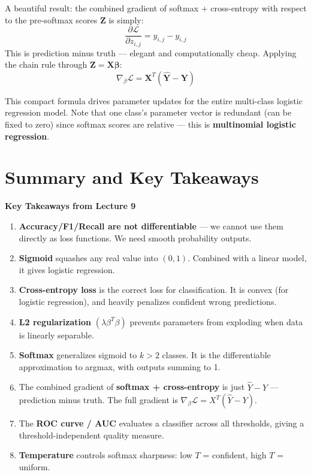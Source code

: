 \documentclass[12pt]{article}
\begin{document}
A beautiful result: the combined gradient of softmax + cross-entropy with respect to the pre-softmax scores $\boldsymbol{Z}$ is simply:
\[
\frac{\partial\mathcal{L}}{\partial z_{i,j}} = \hat{y}_{i,j} - y_{i,j}
\]
This is prediction minus truth --- elegant and computationally cheap. Applying the chain rule through $\boldsymbol{Z} = \boldsymbol{X}\boldsymbol{\beta}$:
\[
\boxed{\nabla_\beta \mathcal{L} = \boldsymbol{X}^T(\hat{\boldsymbol{Y}} - \boldsymbol{Y})}
\]

This compact formula drives parameter updates for the entire multi-class logistic regression model. Note that one class's parameter vector is redundant (can be fixed to zero) since softmax scores are relative --- this is \textbf{multinomial logistic regression}.

\section{Summary and Key Takeaways}

\begin{takeawaybox}
\textbf{Key Takeaways from Lecture 9}
\begin{enumerate}
  \item \textbf{Accuracy/F1/Recall are not differentiable} --- we cannot use them directly as loss functions. We need smooth probability outputs.

  \item \textbf{Sigmoid} squashes any real value into $(0,1)$. Combined with a linear model, it gives logistic regression.

  \item \textbf{Cross-entropy loss} is the correct loss for classification. It is convex (for logistic regression), and heavily penalizes confident wrong predictions.

  \item \textbf{L2 regularization} $(\lambda\beta^T\beta)$ prevents parameters from exploding when data is linearly separable.

  \item \textbf{Softmax} generalizes sigmoid to $k > 2$ classes. It is the differentiable approximation to argmax, with outputs summing to 1.

  \item The combined gradient of \textbf{softmax + cross-entropy} is just $\hat{Y} - Y$ --- prediction minus truth. The full gradient is $\nabla_\beta\mathcal{L} = X^T(\hat{Y} - Y)$.

  \item The \textbf{ROC curve / AUC} evaluates a classifier across all thresholds, giving a threshold-independent quality measure.

  \item \textbf{Temperature} controls softmax sharpness: low $T$ = confident, high $T$ = uniform.
\end{enumerate}
\end{takeawaybox}
\end{document}
